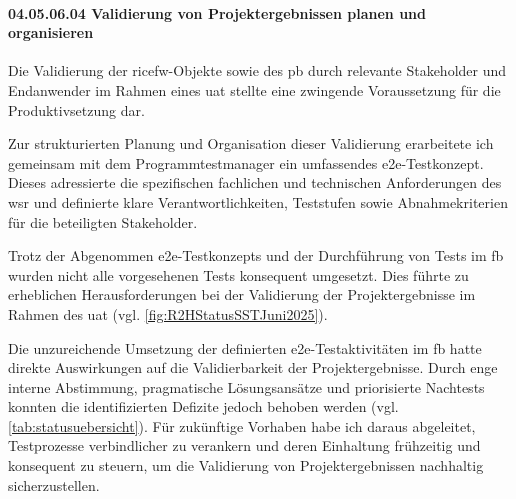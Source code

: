 \paragraph*{04.05.06.04 Validierung von Projektergebnissen planen und organisieren}
\label{para:04.05.06.04_ValidierungVonProjektergebnissen}

\par Die Validierung der \gls{ricefw}-Objekte sowie des \gls{pb} durch relevante Stakeholder und Endanwender im Rahmen eines \gls{uat} stellte eine zwingende Voraussetzung für die Produktivsetzung dar.

\par Zur strukturierten Planung und Organisation dieser Validierung erarbeitete ich gemeinsam mit dem Programmtestmanager ein umfassendes \gls{e2e}-Testkonzept. Dieses adressierte die spezifischen fachlichen und technischen Anforderungen des \gls{wsr} und definierte klare Verantwortlichkeiten, Teststufen sowie Abnahmekriterien für die beteiligten Stakeholder.

\par Trotz der Abgenommen \gls{e2e}-Testkonzepts und der Durchführung von Tests im \gls{fb} wurden nicht alle vorgesehenen Tests konsequent umgesetzt. Dies führte zu erheblichen Herausforderungen bei der Validierung der Projektergebnisse im Rahmen des \gls{uat} (vgl. \autoref{fig:R2HStatusSSTJuni2025}).

\par Die unzureichende Umsetzung der definierten \gls{e2e}-Testaktivitäten im \gls{fb} hatte direkte Auswirkungen auf die Validierbarkeit der Projektergebnisse. Durch enge interne Abstimmung, pragmatische Lösungsansätze und priorisierte Nachtests konnten die identifizierten Defizite jedoch behoben werden (vgl. \autoref{tab:statusuebersicht}). Für zukünftige Vorhaben habe ich daraus abgeleitet, Testprozesse verbindlicher zu verankern und deren Einhaltung frühzeitig und konsequent zu steuern, um die Validierung von Projektergebnissen nachhaltig sicherzustellen.